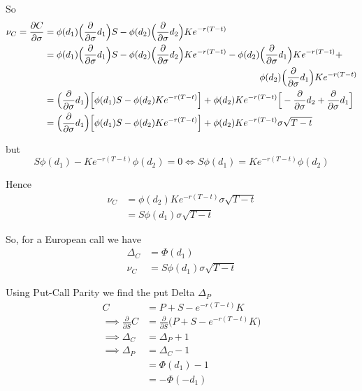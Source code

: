 \documentclass[11pt]{article}
\begin{document}
So
\begin{align*}
	\nu_C = \frac{\partial C}{\partial \sigma} &= \phi(d_1)\Big(\frac{\partial}{\partial \sigma}d_1\Big)S - \phi(d_2)\Big(\frac{\partial}{\partial \sigma}d_2\Big)Ke^{-r(T - t)} \\
	&= \phi(d_1)\Big(\frac{\partial}{\partial \sigma}d_1\Big)S - \phi(d_2)\Big(\frac{\partial}{\partial \sigma}d_2\Big)Ke^{-r(T - t)} - \phi(d_2)\Big(\frac{\partial}{\partial \sigma}d_1\Big)Ke^{-r(T - t)} + \\
	&\hphantom{{}={\phi(d_1)\Big(\frac{\partial}{\partial \sigma}d_1\Big)S -  \phi(d_2)\Big(\frac{\partial}{\partial \sigma}d_2\Big)Ke^{-r(T - t)} - \phi(d_1) }} \phi(d_2)\Big(\frac{\partial}{\partial \sigma}d_1\Big)Ke^{-r(T - t)} \\
	&= \Big(\frac{\partial}{\partial \sigma}d_1\Big)\Big[\phi(d_1)S - \phi(d_2)Ke^{-r(T - t)}\Big] + \phi(d_2)Ke^{-r(T - t)}\Big[-\frac{\partial}{\partial \sigma}d_2 +\frac{\partial}{\partial \sigma}d_1\Big] \\
	&= \Big(\frac{\partial}{\partial \sigma}d_1\Big)\Big[\phi(d_1)S - \phi(d_2)Ke^{-r(T - t)}\Big] + \phi(d_2)Ke^{-r(T - t)}\sigma\sqrt{T - t}
\end{align*}

but
\begin{equation*}
	S\phi(d_1) - Ke^{-r(T - t)}\phi(d_2) = 0 \iff S\phi(d_1) = Ke^{-r(T - t)}\phi(d_2)
\end{equation*}

Hence
\begin{align*}
	\nu_C &= \phi(d_2)Ke^{-r(T - t)}\sigma\sqrt{T - t} \\
	&= S\phi(d_1)\sigma\sqrt{T - t}
\end{align*}

So, for a European call we have
\begin{align*}
	\Delta_C &= \Phi(d_1) \\
	\nu_C &= S\phi(d_1)\sigma\sqrt{T - t}
\end{align*}

Using Put-Call Parity we find the put Delta $\Delta_P$ 
\begin{align*}
	C &= P + S - e^{-r(T - t)}K \\
	\implies \frac{\partial}{\partial S} C &= \frac{\partial}{\partial S} \big(P + S - e^{-r(T - t)}K \big) \\
	\implies \Delta_C &= \Delta_P + 1 \\
	\implies \Delta_P &= \Delta_C - 1 \\
	&= \Phi(d_1) - 1 \\
	&= -\Phi(-d_1)
\end{align*}
\end{document}
